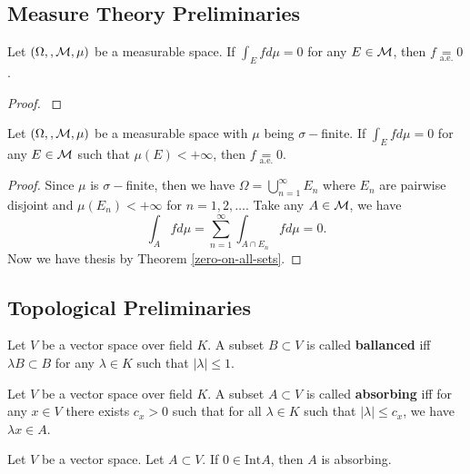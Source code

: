 \documentclass[main.tex]{subfiles}
\begin{document}
\subsection{Measure Theory Preliminaries}
\begin{theorem}
\label{zero-on-all-sets}
Let $(\Omega, , \mathcal{M}, \mu)$ be a measurable space. If $\int_E f d\mu = 0$ for any $E\in \mathcal{M}$, then $f \underset{\text{a.e.}}{=} 0$.
\end{theorem}
\begin{proof}
\cite[See][1.39]{rudin1987}
\end{proof}

\begin{lemma}
\label{zero-on-all-finite-sets}
Let $(\Omega, , \mathcal{M}, \mu)$ be a measurable space with $\mu$ being $\sigma-$finite. If $\int_E f d\mu = 0$ for any $E\in \mathcal{M}$ such that $\mu(E) < +\infty$, then $f \underset{\text{a.e.}}{=} 0$.  
\end{lemma}
\begin{proof}
Since $\mu$ is $\sigma-$finite, then we have $\Omega = \bigcup_{n=1}^\infty E_n$ where $E_n$ are pairwise disjoint and $\mu(E_n) < +\infty$ for $n=1,2, \dots$. Take any $A\in \mathcal{M}$, we have
\begin{equation}
\int_A fd\mu = \sum_{n=1}^\infty \int_{A\cap E_n} f d\mu = 0.
\end{equation}
Now we have thesis by Theorem \ref{zero-on-all-sets}.
\end{proof}
 
\subsection{Topological Preliminaries}

\begin{definition}
Let $V$ be a vector space over field $K$. A subset $B\subset V$ is called \textbf{ballanced} iff $\lambda B \subset B$ for any $\lambda\in K$ such that $|\lambda|\leq 1$.
\end{definition}

\begin{definition}
Let $V$ be a vector space over field $K$. A subset $A \subset V$ is called \textbf{absorbing} iff for any $x\in V$ there exists $c_x > 0$ such that for all $\lambda\in K$ such that $|\lambda| \leq c_x$, we have $\lambda x\in A$.
\end{definition}

\begin{corollary}
Let $V$ be a vector space. Let $A\subset V$. If $0 \in \text{Int} A$, then $A$ is absorbing.
\end{corollary}
\end{document}

